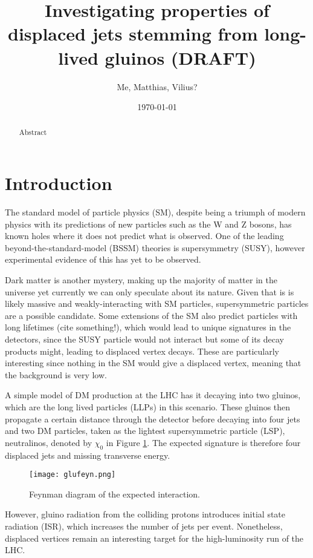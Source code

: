 \documentclass{article}
\title{Investigating properties of displaced jets stemming from long-lived gluinos (DRAFT)}
\author{Me, Matthias, Vilius?}
\date{\today}
\begin{document}
\maketitle

\begin{abstract}
Abstract
\end{abstract}

\section*{Introduction}
The standard model of particle physics (SM), despite being a triumph of modern physics with its predictions of new particles such as the W and Z bosons, has known holes where it does not predict what is observed. One of the leading beyond-the-standard-model (BSSM) theories is supersymmetry (SUSY), however experimental evidence of this has yet to be observed. 


Dark matter is another mystery, making up the majority of matter in the universe yet currently we can only speculate about its nature. Given that is is likely massive and weakly-interacting with SM particles, supersymmetric particles are a possible candidate. Some extensions of the SM also predict particles with long lifetimes (cite something!), which would lead to unique signatures in the detectors, since the SUSY particle would not interact but some of its decay products might, leading to displaced vertex decays. These are particularly interesting since nothing in the SM would give a displaced vertex, meaning that the background is very low.

A simple model of DM production at the LHC has it decaying into two gluinos, which are the long lived particles (LLPs) in this scenario. These gluinos then propagate a certain distance through the detector before decaying into four jets and two DM particles, taken as the lightest supersymmetric particle (LSP), neutralinos, denoted by $\chi_{0}$ in Figure \ref{feyn}. The expected signature is therefore four displaced jets and missing transverse energy. 

\begin{figure}[H]
\centering
\texttt{[image: glufeyn.png]}
\caption{Feynman diagram of the expected interaction. }
	\label{feyn}
\end{figure}


However, gluino radiation from the colliding protons introduces initial state radiation (ISR), which increases the number of jets per event. Nonetheless, displaced vertices remain an interesting target for the high-luminosity run of the LHC.
\end{document}
